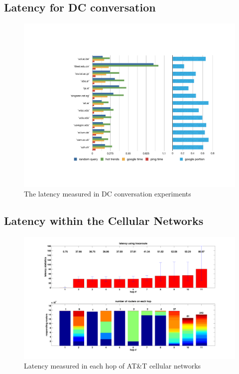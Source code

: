 \subsection{Latency for DC conversation}
\label{sec:latency-dc-conv-1}

\begin{figure}
  \centering
  \includegraphics[width=\linewidth]{../figs/data_center.pdf}
  \caption{The latency measured in DC conversation experiments}
  \label{fig:data_center}
\end{figure}

\subsection{Latency within the Cellular Networks}
\label{sec:latency-with-cell}

\begin{figure}
  \centering
  \includegraphics[width=\linewidth]{../figs/mobile_latency.pdf}
  \caption{Latency measured in each hop of AT\&T cellular networks}
  \label{fig:mobile_latency}
\end{figure}

